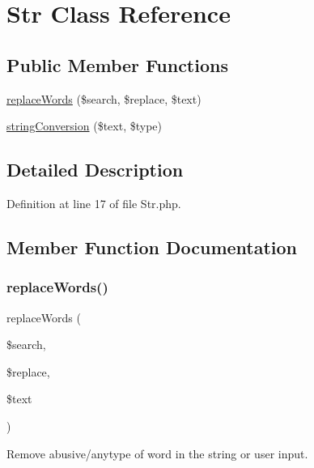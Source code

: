 \hypertarget{class_zest_1_1_str_1_1_str}{}\section{Str Class Reference}
\label{class_zest_1_1_str_1_1_str}
\subsection*{Public Member Functions}
\begin{DoxyCompactItemize}
\item 
\mbox{\hyperlink{class_zest_1_1_str_1_1_str_a65281f1ce6d43988212698322baeaff9}{replace\+Words}} (\$search, \$replace, \$text)
\item 
\mbox{\hyperlink{class_zest_1_1_str_1_1_str_ada36c57d64c5bc69ccb6aa9e3ba2c4c6}{string\+Conversion}} (\$text, \$type)
\end{DoxyCompactItemize}


\subsection{Detailed Description}


Definition at line 17 of file Str.\+php.



\subsection{Member Function Documentation}
\mbox{\label{class_zest_1_1_str_1_1_str_a65281f1ce6d43988212698322baeaff9}} 
\subsubsection{\texorpdfstring{replace\+Words()}{replaceWords()}}
{\footnotesize\ttfamily replace\+Words (\begin{DoxyParamCaption}\item[{}]{\$search,  }\item[{}]{\$replace,  }\item[{}]{\$text }\end{DoxyParamCaption})}

Remove abusive/anytype of word in the string or user input.


